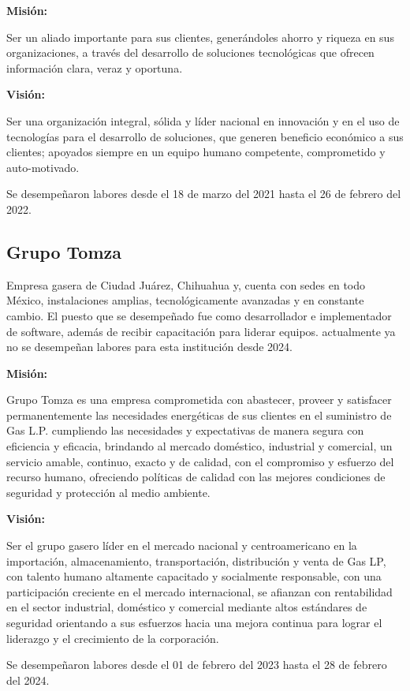 \documentclass[protocolo.tex]{subfiles}
\begin{document}
\textbf{Misión:}

Ser un aliado importante para sus clientes, generándoles ahorro y riqueza en sus organizaciones, a través del desarrollo de soluciones tecnológicas que ofrecen información clara, veraz y oportuna.\vspace{5mm} 


\textbf{Visión:}

Ser una organización integral, sólida y líder nacional en innovación y en el uso de tecnologías para el desarrollo de soluciones, que generen beneficio económico a sus clientes; apoyados siempre en un equipo humano competente, comprometido y auto-motivado.\vspace{5mm}


Se desempeñaron labores desde el 18 de marzo del 2021 hasta el 26 de febrero del 2022.





\subsection{Grupo Tomza}
Empresa gasera de Ciudad Juárez, Chihuahua y, cuenta con sedes en todo México, instalaciones amplias, 
tecnológicamente avanzadas y en constante cambio.
El puesto que se desempeñado fue como desarrollador e implementador de software, 
además de recibir capacitación para liderar equipos. 
actualmente ya no se desempeñan labores para esta institución desde 2024.\vspace{5mm} 

\textbf{Misión:}

Grupo Tomza es una empresa comprometida con abastecer, proveer y satisfacer permanentemente las necesidades energéticas de sus clientes en el suministro de Gas L.P. cumpliendo las necesidades y expectativas de manera segura con eficiencia y eficacia, brindando al mercado doméstico, industrial y comercial, un servicio amable, continuo, exacto y de calidad, con el compromiso y esfuerzo del recurso humano, ofreciendo políticas de calidad con las mejores condiciones de seguridad y protección al medio ambiente.\vspace{5mm} 

\textbf{Visión:} 

Ser el grupo gasero líder en el mercado nacional y centroamericano en la importación, almacenamiento, transportación, distribución y venta de Gas LP, con talento humano altamente capacitado y socialmente responsable, con una participación creciente en el mercado internacional, se afianzan con rentabilidad en el sector industrial, doméstico y comercial mediante altos estándares de seguridad orientando a sus esfuerzos hacia una mejora continua para lograr el liderazgo y el crecimiento de la corporación.\vspace{5mm} 

Se desempeñaron labores desde el 01 de febrero del 2023 hasta el 28 de febrero del 2024.
\end{document}
